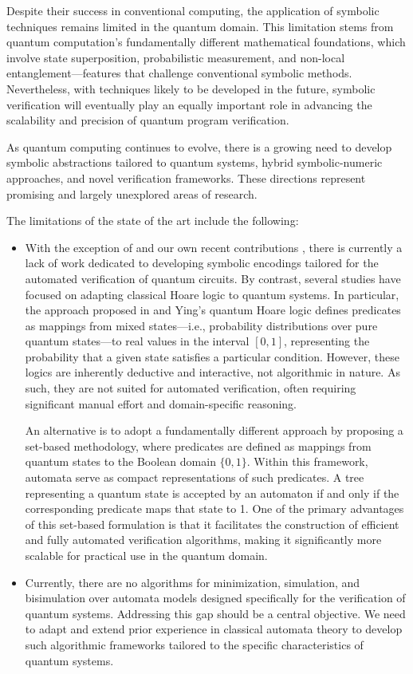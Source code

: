 Despite their success in conventional computing, the application of symbolic techniques remains limited in the quantum domain.
%
This limitation stems from quantum computation’s fundamentally different mathematical foundations, which involve state superposition, probabilistic measurement, and non-local entanglement—features that challenge conventional symbolic methods.
%
Nevertheless, with techniques likely to be developed in the future, symbolic verification will eventually play an equally important role in advancing the scalability and precision of quantum program verification.
%

As quantum computing continues to evolve, there is a growing need to develop symbolic abstractions tailored to quantum systems, hybrid symbolic-numeric approaches, and novel verification frameworks. These directions represent promising and largely unexplored areas of research.
%

The limitations of the state of the art include the following:
%
\begin{itemize}
\item
With the exception of \cite{DBLP:journals/pacmpl/0001CLLTY23} and our own recent contributions \cite{DBLP:journals/pacmpl/AbdullaCCHLLLT25,PLanQC25}, there is currently a lack of work dedicated to developing symbolic encodings tailored for the automated verification of quantum circuits.
%
By contrast, several studies have focused on adapting classical Hoare logic to quantum systems. In particular, the approach proposed in \cite{d2006quantum} and Ying’s quantum Hoare logic \cite{ying2012floyd} defines predicates as mappings from mixed states—i.e., probability distributions over pure quantum states—to real values in the interval $[0,1]$, representing the probability that a given state satisfies a particular condition.
%
However, these logics are inherently deductive and interactive, not algorithmic in nature. As such, they are not suited for automated verification, often requiring significant manual effort and domain-specific reasoning.
%

An alternative is to adopt a fundamentally different approach by proposing a set-based methodology, where predicates are defined as mappings from quantum states to the Boolean domain $\{0,1\}$.
%
Within this framework, automata serve as compact representations of such predicates. A tree representing a quantum state is accepted by an automaton if and only if the corresponding predicate maps that state to 1.
%
One of the primary advantages of this set-based formulation is that it facilitates the construction of efficient and fully automated verification algorithms, making it significantly more scalable for practical use in the quantum domain.
%

\item
Currently, there are no algorithms for minimization, simulation, and bisimulation over automata models designed specifically for the verification of quantum systems.
%
Addressing this gap should be a central objective.
%
We need to adapt and extend prior experience in classical automata theory to develop such algorithmic frameworks tailored to the specific characteristics of quantum systems.
\end{itemize}

